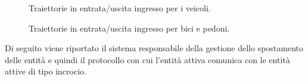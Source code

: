 \begin{figure}[H] %
\caption{Traiettorie in entrata/uscita ingresso per i veicoli.}
\label{fig:Traiettorie in entrata/uscita ingresso per i veicoli}
\end{figure}

\begin{figure}[H] %
\caption{Traiettorie in entrata/uscita ingresso per bici e pedoni.}
\label{fig:Traiettorie in entrata/uscita ingresso per bici e pedoni}
\end{figure}

Di seguito viene riportato il sistema responsabile della gestione dello spostamento delle entità e quindi il protocollo con cui l'entità attiva comunica con le entità attive di tipo incrocio. 
